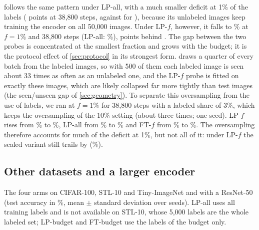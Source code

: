 \union follows the same pattern under LP-all, with a much smaller deficit at 1\% of the labels
( points at 38,800 steps, against 
for \supcon), because its unlabeled images keep training the encoder on all 50,000 images. Under LP-$f$,
however, it falls to \% at $f=1\%$ and 38,800 steps (LP-all:
\%),  points behind \simclr. The gap
between the two probes is concentrated at the smallest fraction and grows with the budget; it is the protocol
effect of \cref{sec:protocol} in its strongest form. \union draws a quarter of every batch from the labeled
images, so with 500 of them each labeled image is seen about 33 times as often as an unlabeled one, and the
LP-$f$ probe is fitted on exactly these images, which are likely collapsed far more tightly than test images
(the seen/unseen gap of \cref{sec:geometry}). To separate this oversampling from the use of labels, we ran
\union at $f=1\%$ for 38,800 steps with a labeled share of 3\%, which keeps the oversampling of the 10\% setting
(about three times; one seed). LP-$f$ rises from \% to \%,
LP-all from \% to \% and FT-$f$ from
\% to \%. The oversampling therefore accounts for much of the
deficit at 1\%, but not all of it: under LP-$f$ the scaled variant still trails \simclr by
\pt (\%).

\subsection{Other datasets and a larger encoder}
\label{sec:datasets}

\begin{table}[t]
\centering
\small
\caption{The four arms on CIFAR-100, STL-10 and Tiny-ImageNet and with a ResNet-50 (test accuracy in \%, mean $\pm$
standard deviation over seeds). LP-all uses all training labels and is not available on STL-10, whose
5,000 labels are the whole labeled set; LP-budget and FT-budget use the labels of the budget only.}
\label{tab:datasets}
\begin{adjustbox}{max width=\linewidth, max totalheight=0.8\textheight}

\end{adjustbox}
\end{table}


